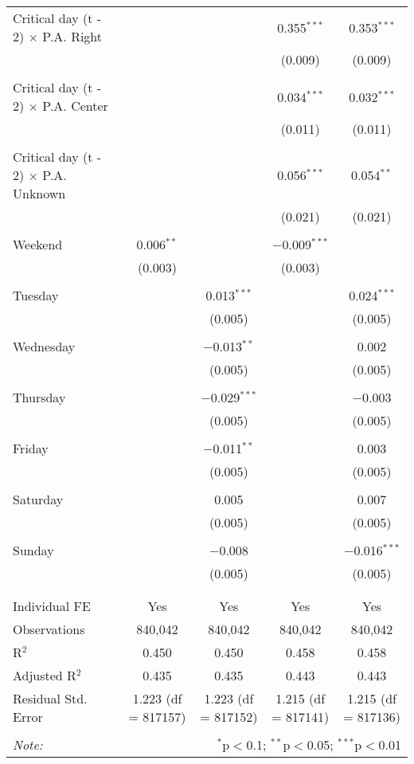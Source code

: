 \documentclass[
]{article}
\begin{document}
\begin{table}[!htbp]
{\begin{tabular}{@{\extracolsep{5pt}}lcccc}
 Critical day (t - 2) $\times$ P.A. Right &  &  & 0.355$^{***}$ & 0.353$^{***}$ \\ 
  &  &  & (0.009) & (0.009) \\ 
  & & & & \\ 
 Critical day (t - 2) $\times$ P.A. Center &  &  & 0.034$^{***}$ & 0.032$^{***}$ \\ 
  &  &  & (0.011) & (0.011) \\ 
  & & & & \\ 
 Critical day (t - 2) $\times$ P.A. Unknown &  &  & 0.056$^{***}$ & 0.054$^{**}$ \\ 
  &  &  & (0.021) & (0.021) \\ 
  & & & & \\ 
 Weekend & 0.006$^{**}$ &  & $-$0.009$^{***}$ &  \\ 
  & (0.003) &  & (0.003) &  \\ 
  & & & & \\ 
 Tuesday &  & 0.013$^{***}$ &  & 0.024$^{***}$ \\ 
  &  & (0.005) &  & (0.005) \\ 
  & & & & \\ 
 Wednesday &  & $-$0.013$^{**}$ &  & 0.002 \\ 
  &  & (0.005) &  & (0.005) \\ 
  & & & & \\ 
 Thursday &  & $-$0.029$^{***}$ &  & $-$0.003 \\ 
  &  & (0.005) &  & (0.005) \\ 
  & & & & \\ 
 Friday &  & $-$0.011$^{**}$ &  & 0.003 \\ 
  &  & (0.005) &  & (0.005) \\ 
  & & & & \\ 
 Saturday &  & 0.005 &  & 0.007 \\ 
  &  & (0.005) &  & (0.005) \\ 
  & & & & \\ 
 Sunday &  & $-$0.008 &  & $-$0.016$^{***}$ \\ 
  &  & (0.005) &  & (0.005) \\ 
  & & & & \\ 
\hline \\[-1.8ex] 
Individual FE & Yes & Yes & Yes & Yes \\ 
Observations & 840,042 & 840,042 & 840,042 & 840,042 \\ 
R$^{2}$ & 0.450 & 0.450 & 0.458 & 0.458 \\ 
Adjusted R$^{2}$ & 0.435 & 0.435 & 0.443 & 0.443 \\ 
Residual Std. Error & 1.223 (df = 817157) & 1.223 (df = 817152) & 1.215 (df = 817141) & 1.215 (df = 817136) \\ 
\hline 
\hline \\[-1.8ex] 
\textit{Note:}  & \multicolumn{4}{r}{$^{*}$p$<$0.1; $^{**}$p$<$0.05; $^{***}$p$<$0.01} \\ 
\end{tabular}
} 
\end{table} 
\newpage
\end{document}
